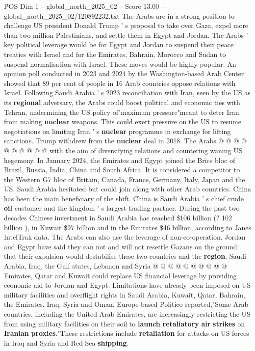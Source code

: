 \begin{textsample}{POS Dim 1 – global\_north\_2025\_02 – Score 13.00 – global\_north\_2025\_02/120892232.txt}  \label{ex:f1_pos_437}
The Arabs are in a strong position to challenge US president Donald Trump ' s proposal to take over Gaza, expel more than two million Palestinians, and settle them in Egypt and Jordan.
The Arabs ' key political leverage would be for Egypt and Jordan to suspend their peace treaties with Israel and for the Emirates, Bahrain, Morocco and Sudan to suspend normalisation with Israel.
These moves would be highly popular.
An opinion poll conducted in 2023 and 2024 by the Washington-based Arab Center showed that 89 per cent of people in 16 Arab countries oppose relations with Israel.
Following Saudi Arabia ' s 2023 reconciliation with Iran, seen by the US as its \textbf{regional} adversary, the Arabs could boost political and economic ties with Tehran, undermining the US policy of"maximum pressure"meant to deter Iran from making \textbf{nuclear} weapons.
This could exert pressure on the US to resume negotiations on limiting Iran ' s \textbf{nuclear} programme in exchange for lifting sanctions.
Trump withdrew from the \textbf{nuclear} deal in 2018.
The Arabs @ @ @ @ @ @ @ @ @ @ with the aim of diversifying relations and countering waning US hegemony.
In January 2024, the Emirates and Egypt joined the Brics bloc of Brazil, Russia, India, China and South Africa.
It is considered a competitor to the Western G7 bloc of Britain, Canada, France, Germany, Italy, Japan and the US.
Saudi Arabia hesitated but could join along with other Arab countries.
China has been the main beneficiary of the shift.
China is Saudi Arabia ' s chief crude \textbf{oil} customer and the kingdom ' s largest trading partner.
During the past two decades Chinese investment in Saudi Arabia has reached \$106 billion (? 102 billion ), in Kuwait \$97 billion and in the Emirates \$46 billion, according to Janes IntelTrak data.
The Arabs can also use the leverage of non-co-operation.
Jordan and Egypt have said they can not and will not resettle Gazans on the ground that their expulsion would destabilise these two countries and the \textbf{region}.
Saudi Arabia, Iraq, the Gulf states, Lebanon and Syria @ @ @ @ @ @ @ @ @ @ Emirates, Qatar and Kuwait could replace US financial leverage by providing economic aid to Jordan and Egypt.
Limitations have already been imposed on US military facilities and overflight rights in Saudi Arabia, Kuwait, Qatar, Bahrain, the Emirates, Iraq, Syria and Oman.
Europe-based Politico reported,"Some Arab countries, including the United Arab Emirates, are increasingly restricting the US from using military facilities on their soil to \textbf{launch} \textbf{retaliatory} \textbf{air} \textbf{strikes} on \textbf{Iranian} \textbf{proxies}."These restrictions include \textbf{retaliation} for attacks on US forces in Iraq and Syria and Red Sea \textbf{shipping}.

\end{textsample}
